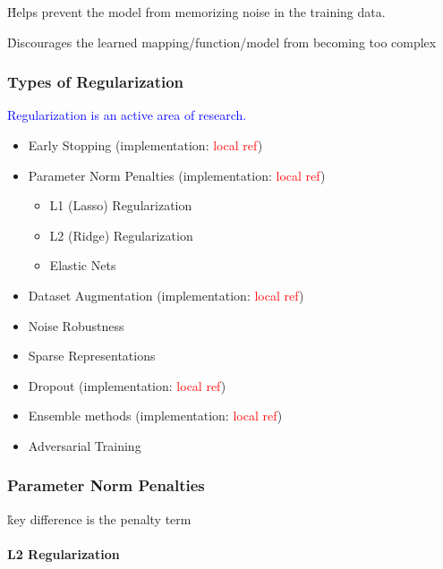 \r{Helps prevent the model from memorizing noise in the training data.}

\r{Discourages the learned mapping/function/model from becoming too complex}


\subsubsection{Types of Regularization}

\textcolor{blue}{Regularization is an active area of research.}


\begin{itemize}[noitemsep,topsep=0pt]
	\item Early Stopping (implementation: \textcolor{red}{local ref})
	\item Parameter Norm Penalties (implementation: \textcolor{red}{local ref})
	\begin{itemize}[noitemsep,topsep=0pt]
		\item L1 (Lasso) Regularization
		\item L2 (Ridge) Regularization
		\item Elastic Nets
	\end{itemize}
	\item Dataset Augmentation (implementation: \textcolor{red}{local ref})
	\item Noise Robustness
	\item Sparse Representations
	\item Dropout (implementation: \textcolor{red}{local ref})
	\item Ensemble methods (implementation: \textcolor{red}{local ref})
	\item Adversarial Training
\end{itemize}



\subsubsection{Parameter Norm Penalties}

\r{key difference is the penalty term}


\paragraph{L2 Regularization}


